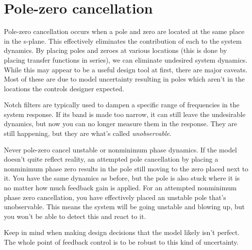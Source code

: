 \section{Pole-zero cancellation}
\label{sec:pole-zero_cancellation}

Pole-zero cancellation occurs when a pole and zero are located at the same place
in the s-plane. This effectively eliminates the contribution of each to the
\gls{system} dynamics. By placing poles and zeroes at various locations (this is
done by placing transfer functions in series), we can eliminate undesired
\gls{system} dynamics. While this may appear to be a useful design tool at
first, there are major caveats. Most of these are due to \gls{model} uncertainty
resulting in poles which aren't in the locations the controls designer expected.

Notch filters are typically used to dampen a specific range of frequencies in
the \gls{system response}. If its band is made too narrow, it can still leave the
undesirable dynamics, but now you can no longer measure them in the response.
They are still happening, but they are what's called \textit{unobservable}.

Never pole-zero cancel unstable or nonminimum phase dynamics. If the \gls{model}
doesn't quite reflect reality, an attempted pole cancellation by placing a
nonminimum phase zero results in the pole still moving to the zero placed next
to it. You have the same dynamics as before, but the pole is also stuck where it
is no matter how much \gls{feedback gain} is applied. For an attempted
nonminimum phase zero cancellation, you have effectively placed an unstable pole
that's unobservable. This means the \gls{system} will be going unstable and
blowing up, but you won't be able to detect this and react to it.

Keep in mind when making design decisions that the \gls{model} likely isn't
perfect. The whole point of feedback control is to be robust to this kind of
uncertainty.
